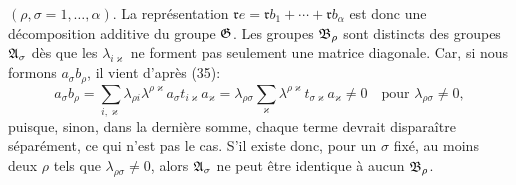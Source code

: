 $(\rho,\sigma=1,\ldots,\alpha)$. La représentation $\mathfrak r e=\mathfrak r b_1+\cdots+\mathfrak r b_\alpha$ est donc une décomposition additive du groupe $\mathfrak{G}$. Les groupes $\mathfrak{B}_\rho$ sont distincts des groupes $\mathfrak{A}_\sigma$ dès que les $\lambda_{i\varkappa}$ ne forment pas seulement une matrice diagonale. Car, si nous formons $a_\sigma b_\rho$, il vient d'après (35):
\[
 a_\sigma b_\rho
 =\sum_{i,\varkappa}\lambda_{\rho i}\lambda^{\rho\varkappa}a_\sigma t_{i\varkappa}a_\varkappa
 =\lambda_{\rho\sigma}
 \sum_\varkappa\lambda^{\rho\varkappa}t_{\sigma\varkappa}a_\varkappa\ne0
 \quad\text{pour }\lambda_{\rho\sigma}\ne0,
\]
puisque, sinon, dans la dernière somme, chaque terme devrait disparaître séparément, ce qui n'est pas le cas. S'il existe donc, pour un $\sigma$ fixé, au moins deux $\rho$ tels que $\lambda_{\rho\sigma}\ne0$, alors $\mathfrak{A}_\sigma$ ne peut être identique à aucun $\mathfrak{B}_\rho$.

